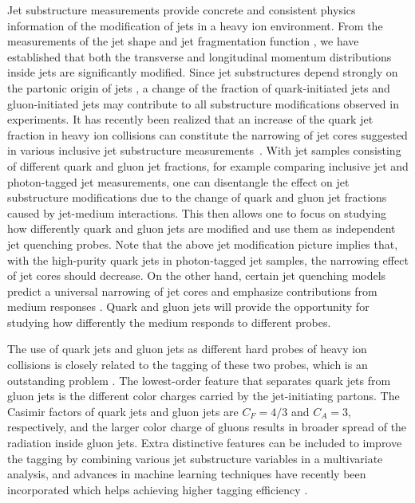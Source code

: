 \documentclass[notoc]{JHEP3}
\begin{document}
Jet substructure measurements provide concrete and consistent physics information of the modification of jets in a heavy ion environment. From the measurements of the jet shape \cite{Ellis:1992qq,Chatrchyan:2013kwa,Khachatryan:2016tfj,Seymour:1997kj,Li:2011hy,Li:2012bw,Vitev:2008rz,Vitev:2009rd} and jet fragmentation function \cite{Procura:2009vm,Chatrchyan:2012gw,Aad:2014wha,Chatrchyan:2014ava,Aaboud:2017bzv,Sirunyan:2018qec}, we have established that both the transverse and longitudinal momentum distributions inside jets are significantly modified. Since jet substructures depend strongly on the partonic origin of jets \cite{Gallicchio:2011xq,Gallicchio:2012ez,Chien:2015ctp,Chien:2014nsa}, a change of the fraction of quark-initiated jets and gluon-initiated jets may contribute to all substructure modifications observed in experiments. It has recently been realized that an increase of the quark jet fraction in heavy ion collisions can constitute the narrowing of jet cores suggested in various inclusive jet substructure measurements~\cite{Chien:2015hda,Spousta:2015fca}. With jet samples consisting of different quark and gluon jet fractions, for example comparing inclusive jet and photon-tagged jet measurements, one can disentangle the effect on jet substructure modifications due to the change of quark and gluon jet fractions caused by jet-medium interactions. This then allows one to focus on studying how differently quark and gluon jets are modified and use them as independent jet quenching probes. Note that the above jet modification picture implies that, with the high-purity quark jets in photon-tagged jet samples, the narrowing effect of jet cores should decrease. On the other hand, certain jet quenching models predict a universal narrowing of jet cores \cite{KunnawalkamElayavalli:2017hxo,Milhano:2017nzm,Casalderrey-Solana:2016jvj,Brewer:2017fqy} and emphasize contributions from medium responses \cite{Tachibana:2017syd}. Quark and gluon jets will provide the opportunity for studying how differently the medium responds to different probes.

The use of quark jets and gluon jets as different hard probes of heavy ion collisions is closely related to the tagging of these two probes, which is an outstanding problem \cite{Gras:2017jty,Frye:2017yrw}. The lowest-order feature that separates quark jets from gluon jets is the different color charges carried by the jet-initiating partons. The Casimir factors of quark jets and gluon jets are $C_F = 4/3$ and $C_A=3$, respectively, and the larger color charge of gluons results in broader spread of the radiation inside gluon jets. Extra distinctive features can be included to improve the tagging by combining various jet substructure variables in a multivariate analysis, and advances in machine learning techniques have recently been incorporated which helps achieving higher tagging efficiency \cite{Komiske:2016rsd}.
\end{document}
